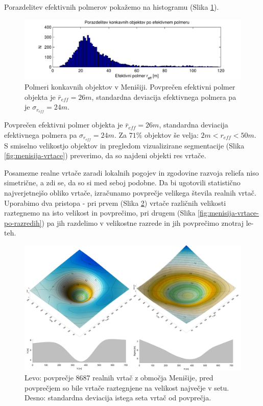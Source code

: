 \documentclass[a4paper, twoside, 12pt]{book}
\begin{document}
Porazdelitev efektivnih polmerov pokažemo na histogramu (Slika \ref{fig:menisija-polmeri-hist}).
  \begin{figure}[h!]
    \begin{center}
      \includegraphics[width=14cm]{slike/menisija-polmeri-hist}
    \end{center}
    \caption{Polmeri konkavnih objektov v Menišiji. Povprečen efektivni polmer objekta je $\bar r_{eff}=26m$, standardna deviacija efektivnega polmera pa je $\sigma_{r_{eff}}=24m$.}
    \label{fig:menisija-polmeri-hist}
  \end{figure}
Povprečen efektivni polmer objekta je $\bar r_{eff}=26m$, standardna deviacija efektivnega polmera pa $\sigma_{r_{eff}}=24m$. Za $71\%$ objektov še velja: $2m < r_{eff} < 50m$.
S smiselno velikostjo objektov in pregledom vizualizirane segmentacije (Slika \ref{fig:menisija-vrtace}) preverimo, da so najdeni objekti res vrtače.

  Posamezne realne vrtače zaradi lokalnih pogojev in zgodovine razvoja reliefa niso simetrične, a zdi se, da so si med seboj podobne. Da bi ugotovili statistično najverjetnejšo obliko vrtače, izračunamo povprečje velikega števila realnih vrtač. Uporabimo dva pristopa - pri prvem (Slika \ref{fig:menisija-vrtaca}) vrtače različnih velikosti raztegnemo na isto velikost in povprečimo, pri drugem (Slika \ref{fig:menisija-vrtace-po-razredih}) pa jih razdelimo v velikostne razrede in jih povprečimo znotraj le-teh.

  \begin{figure}[h!]
    \begin{center}
      \includegraphics[width=14cm]{slike/menisija-vrtaca-sigma}
    \end{center}
    \caption{Levo: povprečje 8687 realnih vrtač z območja Menišije, pred povprečjem so bile vrtače raztegnjene na velikost največje v setu. Desno: standardna deviacija istega seta vrtač od povprečja.}
    \label{fig:menisija-vrtaca}
  \end{figure}
\end{document}
